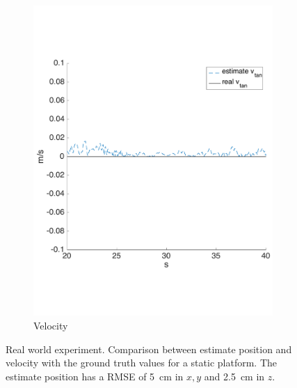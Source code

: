 \begin{figure}[!htbp]
\begin{subfigure}[b]{0.45\textwidth}
        \includegraphics[width=\textwidth]{img/tag_static_real_world_vel.pdf}
        \caption{Velocity}
        \label{fig:two_ekf_real_world_static}
   \end{subfigure}
  \caption{Real world experiment. Comparison between estimate position and velocity with the ground truth values for a static platform. The estimate position has a RMSE of \SI{5}{\centi \meter} in $x,y$ and \SI{2.5}{\centi \meter} in $z$.}
  \label{fig:ekf_real_world_static}
\end{figure} 

